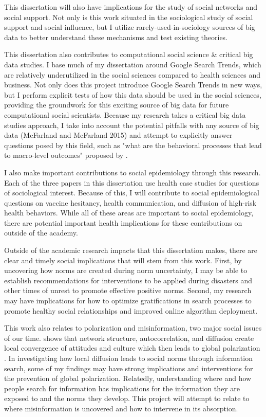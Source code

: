 This dissertation will also have implications for the study of social
networks and social support. Not only is this work situated in the
sociological study of social support and social influence, but I utilize
rarely-used-in-sociology sources of big data to better understand these
mechanisms and test existing theories.

This dissertation also contributes to computational social science \&
critical big data studies. I base much of my dissertation around Google
Search Trends, which are relatively underutilized in the social sciences
compared to health sciences and business. Not only does this project
introduce Google Search Trends in new ways, but I perform explicit tests
of how this data should be used in the social sciences, providing the
groundwork for this exciting source of big data for future computational
social scientists. Because my research takes a critical big data studies
approach, I take into account the potential pitfalls with any source of
big data (McFarland and McFarland 2015) and attempt to explicitly answer
questions posed by this field, such as "what are the behavioral
processes that lead to macro-level outcomes" proposed by \citet{breigerScaling2015}.

I also make important contributions to social epidemiology through this
research. Each of the three papers in this dissertation use health case
studies for questions of sociological interest. Because of this, I will
contribute to social epidemiological questions on vaccine hesitancy,
health communication, and diffusion of high-risk health behaviors. While
all of these areas are important to social epidemiology, there are
potential important health implications for these contributions on
outside of the academy.

Outside of the academic research impacts that this dissertation makes,
there are clear and timely social implications that will stem from this
work. First, by uncovering how norms are created during norm
uncertainty, I may be able to establish recommendations for
interventions to be applied during disasters and other times of unrest
to promote effective positive norms. Second, my research may have
implications for how to optimize gratifications in search processes to
promote healthy social relationships and improved online algorithm
deployment.

This work also relates to polarization and misinformation, two major
social issues of our time. \citet{axelrodDisseminationCultureModel1997} shows that network structure,
autocorrelation, and diffusion create local convergence of attitudes and
culture which then leads to global polarization \citep{dellapostaWhyLiberalsDrink2015}. In investigating how local diffusion leads to social norms
through information search, some of my findings may have strong
implications and interventions for the prevention of global
polarization. Relatedly, understanding where and how people search for
information has implications for the information they are exposed to and
the norms they develop. This project will attempt to relate to where
misinformation is uncovered and how to intervene in its absorption.

